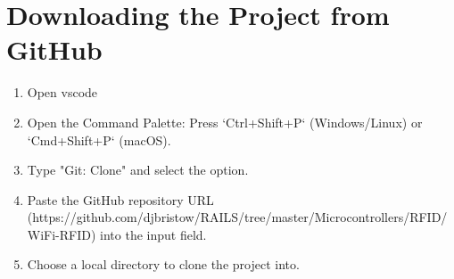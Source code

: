 \section{Downloading the Project from GitHub}
\begin{enumerate}
    \item Open \gls{vscode}
    \item Open the Command Palette: Press `Ctrl+Shift+P` (Windows/Linux) or `Cmd+Shift+P` (macOS).
    \item Type "Git: Clone" and select the option.
    \item Paste the GitHub repository URL\\ (https://github.com/djbristow/RAILS/tree/master/Microcontrollers/RFID/WiFi-RFID) into the input field.
    \item Choose a local directory to clone the project into.
\end{enumerate}

